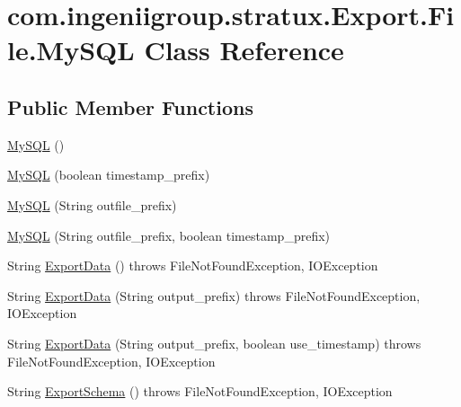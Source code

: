\hypertarget{classcom_1_1ingeniigroup_1_1stratux_1_1_export_1_1_file_1_1_my_s_q_l}{}\section{com.\+ingeniigroup.\+stratux.\+Export.\+File.\+My\+S\+QL Class Reference}
\label{classcom_1_1ingeniigroup_1_1stratux_1_1_export_1_1_file_1_1_my_s_q_l}
\subsection*{Public Member Functions}
\begin{DoxyCompactItemize}
\item 
\hyperlink{classcom_1_1ingeniigroup_1_1stratux_1_1_export_1_1_file_1_1_my_s_q_l_ad1a674c6906feae505b00a39abec422b}{My\+S\+QL} ()
\item 
\hyperlink{classcom_1_1ingeniigroup_1_1stratux_1_1_export_1_1_file_1_1_my_s_q_l_a75a12f5db5108e3bd105e21a646bcd2a}{My\+S\+QL} (boolean timestamp\+\_\+prefix)
\item 
\hyperlink{classcom_1_1ingeniigroup_1_1stratux_1_1_export_1_1_file_1_1_my_s_q_l_acf946efff928c9f0f25aedccafa62951}{My\+S\+QL} (String outfile\+\_\+prefix)
\item 
\hyperlink{classcom_1_1ingeniigroup_1_1stratux_1_1_export_1_1_file_1_1_my_s_q_l_a9d40595319e59b353eb836b6b3f967db}{My\+S\+QL} (String outfile\+\_\+prefix, boolean timestamp\+\_\+prefix)
\item 
String \hyperlink{classcom_1_1ingeniigroup_1_1stratux_1_1_export_1_1_file_1_1_my_s_q_l_aa4973da967a17f40546bcb7eabea858b}{Export\+Data} ()  throws File\+Not\+Found\+Exception, I\+O\+Exception 
\item 
String \hyperlink{classcom_1_1ingeniigroup_1_1stratux_1_1_export_1_1_file_1_1_my_s_q_l_a12f586368816e6b5130b628c21cada96}{Export\+Data} (String output\+\_\+prefix)  throws File\+Not\+Found\+Exception, I\+O\+Exception 
\item 
String \hyperlink{classcom_1_1ingeniigroup_1_1stratux_1_1_export_1_1_file_1_1_my_s_q_l_af423e584112b51c70f14636fcebc390f}{Export\+Data} (String output\+\_\+prefix, boolean use\+\_\+timestamp)  throws File\+Not\+Found\+Exception, I\+O\+Exception 
\item 
String \hyperlink{classcom_1_1ingeniigroup_1_1stratux_1_1_export_1_1_file_1_1_my_s_q_l_a2ba474e365d832668b02280ae5f47f35}{Export\+Schema} ()  throws File\+Not\+Found\+Exception, I\+O\+Exception 

\end{DoxyCompactItemize}
